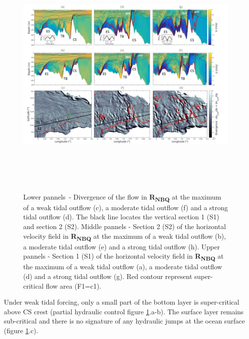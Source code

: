 \begin{figure}[!h]
	\begin{Center}
		\includegraphics[width=6.61in,height=4.99in]{./media/image5.jpg}
	\end{Center}



\caption{ Lower pannels\ -  Divergence of the flow in \textbf{R\textsubscript{NBQ}} at the maximum of a weak tidal outflow (c), a moderate tidal outflow (f) and a strong tidal outflow (d). The black line locates the vertical section 1 (S1) and section 2 (S2). Middle pannels - Section 2 (S2) of the horizontal velocity field in \textbf{R\textsubscript{NBQ}} at the maximum of a weak tidal outflow (b), a moderate tidal outflow (e) and a strong tidal outflow (h). Upper pannels - Section 1 (S1) of the horizontal velocity field in \textbf{R\textsubscript{NBQ}} at the maximum of a weak tidal outflow (a), a moderate tidal outflow (d) and a strong tidal outflow (g). Red contour represent super-critical flow area (F1=c1).}
\label{Fig5_Lucie}
\end{figure}

\vspace{\baselineskip}
Under weak tidal forcing, only a small part of the bottom layer is super-critical above CS crest (partial hydraulic control figure \ref{Fig5_Lucie}.a-b). The surface layer remains sub-critical and there is no signature of any hydraulic jumps at the ocean surface (figure \ref{Fig5_Lucie}.c). \par

